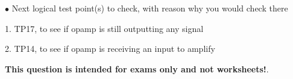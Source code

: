 \medskip
\goodbreak
\item{$\bullet$} Next logical test point(s) to check, with reason why you would check there
\item{1.} TP17, to see if opamp is still outputting any signal
\item{2.} TP14, to see if opamp is receiving an input to amplify
\medskip







{\bf This question is intended for exams only and not worksheets!}.




